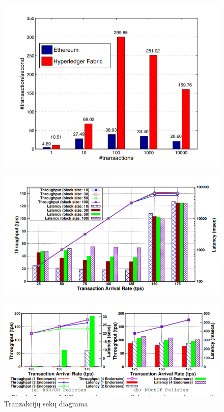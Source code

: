\documentclass{VUMIFPSkursinis}
\begin{document}
\begin{figure}
\centering
\begin{minipage}{.5\textwidth}
  \centering
  \includegraphics[width=1\linewidth]{img/One}
  \label{fig:test1}
\end{minipage}%
\begin{minipage}{.5\textwidth}
  \centering
  \includegraphics[width=1\linewidth]{img/OneVelavimas}
  \label{fig:test2}
\end{minipage}
\end{figure}
		

\begin{figure}[H]
    \centering
    \includegraphics[scale=0.7]{img/PraeinamumasPolicy}
    \caption{Tranzakcijų sekų diagrama}   %
    \label{img:mlp}
\end{figure}
\end{document}
